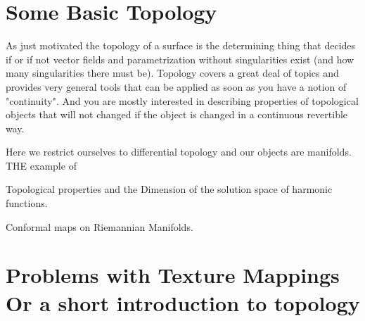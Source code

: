 	\section{Some Basic Topology}
	As just motivated the topology of a surface is the determining thing that decides if or if not vector fields and parametrization without singularities exist (and how many singularities there must be). Topology covers a great deal of topics and provides very general tools that can  be applied as soon as you have a notion of "continuity". And you are mostly interested in describing properties of topological objects that will not changed if the object is changed in a continuous revertible way.
	
	Here we restrict ourselves to differential topology and our objects are manifolds. THE example of 
	
	
	Topological properties and the Dimension of the solution space of harmonic functions.
	
	Conformal maps on Riemannian Manifolds.	
	\section{Problems with Texture Mappings Or a short introduction to topology}
	